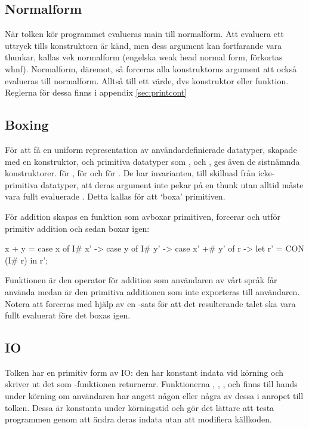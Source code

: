 \documentclass[../Core]{subfiles}
\begin{document}

\subsection{Normalform}
\label{sec:whnf}
\label{sec:nf}

När tolken kör programmet evalueras main till normalform.
Att evaluera ett uttryck tills konstruktorn är känd, men dess argument kan 
fortfarande vara thunkar, kallas vek normalform 
(engelska weak head normal form, förkortas whnf). Normalform, däremot, så
forceras alla konstruktorns argument att också evalueras till normalform.
Alltså till ett värde, dvs konstruktor eller funktion. Reglerna för dessa
finns i appendix \ref{sec:printcont}

\subsection{Boxing}
\label{sec:boxing}

För att få en uniform representation av användardefinierade datatyper, skapade
med en konstruktor, och primitiva datatyper som ,  och , ges även 
de sistnämnda konstruktorer.  för ,  för  och 
 för . De har invarianten, till skillnad från icke-primitiva datatyper, 
att deras argument inte pekar på en thunk utan alltid måste vara fullt evaluerade  \cite{santos}. 
Detta kallas för att `boxa' primitiven.

    För addition skapas en funktion som avboxar primitiven,
forcerar och utför primitiv addition och sedan boxar igen:

\begin{codeEx}
x + y = case x of 
    { I# x' -> case y of
        { I# y' -> case x' +# y' of
            { r -> let r' = CON (I# r) in  r'}}};
\end{codeEx}

Funktionen \ic{+} är den operator för addition som användaren av vårt språk 
får använda medan \ic{+\#} är den primitiva additionen som inte exporteras till 
användaren. Notera att 
forceras med hjälp av en -sats för att det resulterande talet ska vara fullt
evaluerat före det boxas igen.

\subsection{IO}
Tolken har en primitiv form av IO: den har konstant indata vid körning och
skriver ut det som -funktionen returnerar. Funktionerna 
, 
,
,
 och 
finns till hands under körning om användaren har angett någon eller några av
dessa i anropet till tolken. Dessa är konstanta under körningstid och gör det
lättare att testa programmen genom att ändra deras indata utan att modifiera
källkoden.
\end{document}
